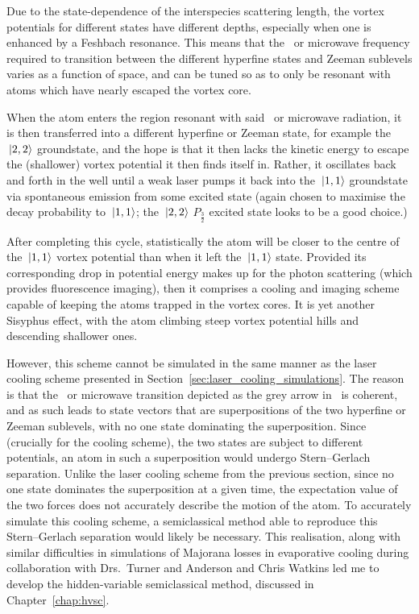 Due to the state-dependence of the interspecies scattering length, the vortex potentials for different states have different depths, especially when one is enhanced by a Feshbach resonance. This means that the \rf\ or microwave frequency required to transition between the different hyperfine states and Zeeman sublevels varies as a function of space, and can be tuned so as to only be resonant with atoms which have nearly escaped the vortex core.

When the atom enters the region resonant with said \rf\ or microwave radiation, it is then transferred into a different hyperfine or Zeeman state, for example the $\ket{2,2}$ groundstate, and the hope is that it then lacks the kinetic energy to escape the (shallower) vortex potential it then finds itself in. Rather, it oscillates back and forth in the well until a weak laser pumps it back into the $\ket{1,1}$ groundstate via spontaneous emission from some excited state (again chosen to maximise the decay probability to $\ket{1,1}$; the $\ket{2,2}$ $P_\frac32$ excited state looks to be a good choice.)

After completing this cycle, statistically the atom will be closer to the centre of the  $\ket{1,1}$ vortex potential than when it left the $\ket{1,1}$ state. Provided its corresponding drop in potential energy makes up for the photon scattering (which provides fluorescence imaging), then it comprises a cooling and imaging scheme capable of keeping the atoms trapped in the vortex cores. It is yet another Sisyphus effect, with the atom climbing steep vortex potential hills and descending shallower ones.

However, this scheme cannot be simulated in the same manner as the laser cooling scheme presented in Section~\ref{sec:laser_cooling_simulations}. The reason is that the \rf\ or microwave transition depicted as the grey arrow in~ is coherent, and as such leads to state vectors that are superpositions of the two hyperfine or Zeeman sublevels, with no one state dominating the superposition. Since (crucially for the cooling scheme), the two states are subject to different potentials, an atom in such a superposition would undergo Stern--Gerlach separation. Unlike the laser cooling scheme from the previous section, since no one state dominates the superposition at a given time, the expectation value of the two forces does not accurately describe the motion of the atom. To accurately simulate this cooling scheme, a semiclassical method able to reproduce this Stern--Gerlach separation would likely be necessary. This realisation, along with similar difficulties in simulations of Majorana losses in evaporative cooling during collaboration with Drs.~Turner and Anderson and Chris Watkins led me to develop the hidden-variable semiclassical method, discussed in Chapter~\ref{chap:hvsc}.

